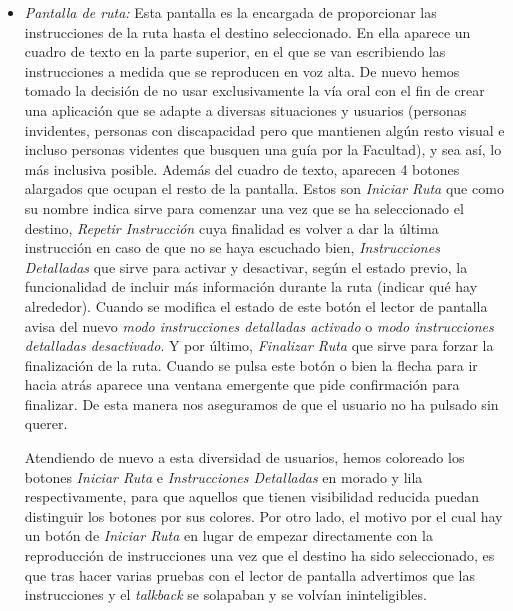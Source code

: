 \begin{itemize}
	\item \textit{Pantalla de ruta:} Esta pantalla es la encargada de proporcionar las instrucciones de la ruta hasta el destino seleccionado. En ella aparece un cuadro de texto en la parte superior, en el que se van escribiendo las instrucciones a medida que se reproducen en voz alta. De nuevo hemos tomado la decisión de no usar exclusivamente la vía oral con el fin de crear una aplicación que se adapte a diversas situaciones y usuarios (personas invidentes, personas con discapacidad pero que mantienen algún resto visual e incluso personas videntes que busquen una guía por la Facultad), y sea así, lo más inclusiva posible. Además del cuadro de texto, aparecen 4 botones alargados que ocupan el resto de la pantalla. Estos son \textit{Iniciar Ruta} que como su nombre indica sirve para comenzar una vez que se ha seleccionado el destino, \textit{Repetir Instrucción} cuya finalidad es volver a dar la última instrucción en caso de que no se haya escuchado bien, \textit{Instrucciones Detalladas} que sirve para activar y desactivar, según el estado previo, la funcionalidad de incluir más información durante la ruta (indicar qué hay alrededor). Cuando se modifica el estado de este botón el lector de pantalla avisa del nuevo \textit{modo instrucciones detalladas activado} o \textit{modo instrucciones detalladas desactivado}. Y por último, \textit{Finalizar Ruta} que sirve para forzar la finalización de la ruta. Cuando se pulsa este botón o bien la flecha para ir hacia atrás aparece una ventana emergente que pide confirmación para finalizar. De esta manera nos aseguramos de que el usuario no ha pulsado sin querer. 
	
	Atendiendo de nuevo a esta diversidad de usuarios, hemos coloreado los botones \textit{Iniciar Ruta} e \textit{Instrucciones Detalladas} en morado y lila respectivamente, para que aquellos que tienen visibilidad reducida puedan distinguir los botones por sus colores. Por otro lado, el motivo por el cual hay un botón de \textit{Iniciar Ruta} en lugar de empezar directamente con la reproducción de instrucciones una vez que el destino ha sido seleccionado, es que tras hacer varias pruebas con el lector de pantalla advertimos que las instrucciones y el \textit{talkback} se solapaban y se volvían ininteligibles.
	

\end{itemize}
